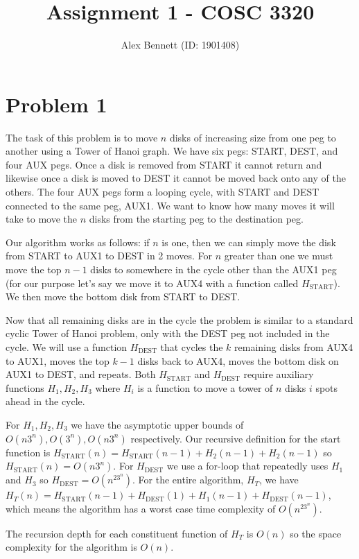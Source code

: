 \documentclass[11pt]{article}
\title{Assignment 1 - COSC 3320}
\author{Alex Bennett (ID: 1901408)}
\date{}
\begin{document}
\maketitle

\section*{Problem 1}

The task of this problem is to move $n$ disks of increasing size from one peg to another using a Tower of Hanoi graph. We have six pegs: START, DEST, and four AUX pegs. Once a disk is removed from START it cannot return and likewise once a disk is moved to DEST it cannot be moved back onto any of the others. The four AUX pegs form a looping cycle, with START and DEST connected to the same peg, AUX1. We want to know how many moves it will take to move the $n$ disks from the starting peg to the destination peg.

Our algorithm works as follows: if $n$ is one, then we can simply move the disk from START to AUX1 to DEST in 2 moves. For $n$ greater than one we must move the top $n-1$ disks to somewhere in the cycle other than the AUX1 peg (for our purpose let's say we move it to AUX4 with a function called $H_{\text{START}}$). We then move the bottom disk from START to DEST. 

Now that all remaining disks are in the cycle the problem is similar to a standard cyclic Tower of Hanoi problem, only with the DEST peg not included in the cycle. We will use a function $H_{\text{DEST}}$ that cycles the $k$ remaining disks from AUX4 to AUX1, moves the top $k-1$ disks back to AUX4, moves the bottom disk on AUX1 to DEST, and repeats. Both $H_{\text{START}}$ and $H_{\text{DEST}}$ require auxiliary functions $H_1, H_2, H_3$ where $H_i$ is a function to move a tower of $n$ disks $i$ spots ahead in the cycle.

For $H_1, H_2, H_3$ we have the asymptotic upper bounds of $O(n3^n), O(3^n), O(n3^n)$ respectively. Our recursive definition for the start function is $H_{\text{START}}(n) = H_{\text{START}}(n-1) + H_2(n-1) + H_2(n-1)$ so $H_{\text{START}}(n) = O(n3^n)$. For $H_{\text{DEST}}$ we use a for-loop that repeatedly uses $H_1$ and $H_3$ so $H_{\text{DEST}} = O(n^23^n)$. For the entire algorithm, $H_T$, we have $H_T(n) = H_{\text{START}}(n-1) + H_{\text{DEST}}(1) + H_1(n-1) + H_{\text{DEST}}(n-1)$, which means the algorithm has a worst case time complexity of $O(n^23^n)$.

The recursion depth for each constituent function of $H_T$ is $O(n)$ so the space complexity for the algorithm is $O(n)$.
\end{document}
